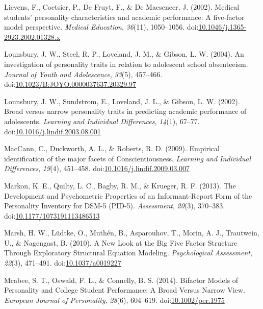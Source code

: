 \documentclass[,man,floatsintext]{apa6}
\begin{document}
\hypertarget{ref-Lievens2002}{}
Lievens, F., Coetsier, P., De Fruyt, F., \& De Maeseneer, J. (2002).
Medical students' personality characteristics and academic performance:
A five-factor model perspective. \emph{Medical Education},
\emph{36}(11), 1050--1056.
doi:\href{https://doi.org/10.1046/j.1365-2923.2002.01328.x}{10.1046/j.1365-2923.2002.01328.x}

\hypertarget{ref-Lounsbury2004}{}
Lounsbury, J. W., Steel, R. P., Loveland, J. M., \& Gibson, L. W.
(2004). An investigation of personality traits in relation to adolescent
school absenteeism. \emph{Journal of Youth and Adolescence},
\emph{33}(5), 457--466.
doi:\href{https://doi.org/10.1023/B:JOYO.0000037637.20329.97}{10.1023/B:JOYO.0000037637.20329.97}

\hypertarget{ref-Lounsbury2002}{}
Lounsbury, J. W., Sundstrom, E., Loveland, J. L., \& Gibson, L. W.
(2002). Broad versus narrow personality traits in predicting academic
performance of adolescents. \emph{Learning and Individual Differences},
\emph{14}(1), 67--77.
doi:\href{https://doi.org/10.1016/j.lindif.2003.08.001}{10.1016/j.lindif.2003.08.001}

\hypertarget{ref-MacCann2009}{}
MacCann, C., Duckworth, A. L., \& Roberts, R. D. (2009). Empirical
identification of the major facets of Conscientiousness. \emph{Learning
and Individual Differences}, \emph{19}(4), 451--458.
doi:\href{https://doi.org/10.1016/j.lindif.2009.03.007}{10.1016/j.lindif.2009.03.007}

\hypertarget{ref-Markon2013}{}
Markon, K. E., Quilty, L. C., Bagby, R. M., \& Krueger, R. F. (2013).
The Development and Psychometric Properties of an Informant-Report Form
of the Personality Inventory for DSM-5 (PID-5). \emph{Assessment},
\emph{20}(3), 370--383.
doi:\href{https://doi.org/10.1177/1073191113486513}{10.1177/1073191113486513}

\hypertarget{ref-Marsh2010}{}
Marsh, H. W., Lüdtke, O., Muthén, B., Asparouhov, T., Morin, A. J.,
Trautwein, U., \& Nagengast, B. (2010). A New Look at the Big Five
Factor Structure Through Exploratory Structural Equation Modeling.
\emph{Psychological Assessment}, \emph{22}(3), 471--491.
doi:\href{https://doi.org/10.1037/a0019227}{10.1037/a0019227}

\hypertarget{ref-Mcabee2014}{}
Mcabee, S. T., Oswald, F. L., \& Connelly, B. S. (2014). Bifactor Models
of Personality and College Student Performance: A Broad Versus Narrow
View. \emph{European Journal of Personality}, \emph{28}(6), 604--619.
doi:\href{https://doi.org/10.1002/per.1975}{10.1002/per.1975}
\end{document}
